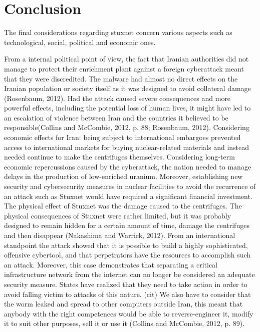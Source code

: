 \documentclass[12pt]{article}
\begin{document}
\section{Conclusion}
The final considerations regarding stuxnet concern various aspects such as technological, social, political and economic ones.

From a internal political point of view, the fact  that Iranian authorities did not manage to protect their enrichment plant against a foreign cyberattack meant that they were discredited.
The malware had almost no direct effects on the Iranian population or society itself as it was designed to avoid collateral damage (Rosenbaum, 2012). Had the attack caused severe consequences and more powerful effects, including the potential loss of human lives, it might have led to an escalation of violence between Iran and the countries it believed to be responsible(Collins and McCombie, 2012, p. 88; Rosenbaum, 2012). 
Considering economic effects for Iran: being subject to international embargoes prevented access to international markets for buying nuclear-related materials and instead needed continue to make the centrifuges themselves.
Considering long-term economic repercussions caused by the cyberattack, the nation needed to manage delays in the production of low-enriched uranium. Moreover, establishing new security and cybersecurity measures in nuclear facilities to avoid the recurrence of an attack such as Stuxnet would have required a significant financial investment. 
The physical effect of Stuxnet was the damage caused to the centrifuges.
The physical consequences of Stuxnet were rather limited, but it was probably designed to remain hidden for a certain amount of time, damage the centrifuges and then disappear (Nakashima and Warrick, 2012).
From an international standpoint the attack showed that it is possible to build a highly sophisticated, offensive cybertool, and that perpetrators have the resources to accomplish such an attack. Moreover, this case demonstrates that separating a critical infrastructure network from the internet can no longer be considered an adequate security measure. States have realized that they need to take action in order to avoid falling victim to attacks of this nature. (cit)
We also have to consider that the worm leaked and spread to other computers outside Iran, this meant that anybody with the right competences would be able to reverse-engineer it, modify it to suit other purposes, sell it or use it (Collins and McCombie, 2012, p. 89).
\end{document}

